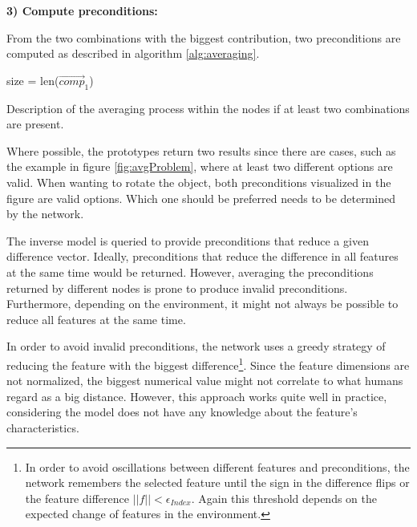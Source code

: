\textbf{3) Compute preconditions:}

From the two combinations with the biggest contribution, two preconditions are computed as described in algorithm \ref{alg:averaging}.

\begin{algorithm}
	\BlankLine
	size = len($\vec{comp}_1$) \\
	\caption{Description of the averaging process within the nodes if at least two combinations are present.}
	\label{alg:averaging}
\end{algorithm}

Where possible, the prototypes return two results since there are cases, such as the example in figure \ref{fig:avgProblem}, where at least two different options are valid. When wanting to rotate the object, both preconditions visualized in the figure are valid options. Which one should be preferred needs to be determined by the network.

The inverse model is queried to provide preconditions that reduce a given difference vector. Ideally, preconditions that reduce the difference in all features at the same time would be returned. 
However, averaging the preconditions returned by different nodes is prone to produce invalid preconditions. 
Furthermore, depending on the environment, it might not always be possible to reduce all features at the same time. 

In order to avoid invalid preconditions, the network uses a greedy strategy of reducing the feature with the biggest difference\footnote{In order to avoid oscillations between different features and preconditions, the network remembers the selected feature until the sign in the difference flips or the feature difference $||f|| < \epsilon_{Index}$. Again this threshold depends on the expected change of features in the environment.}. Since the feature dimensions are not normalized, the biggest numerical value might not correlate to what humans regard as a big distance. 
However, this approach works quite well in practice, considering the model does not have any knowledge about the feature's characteristics. 

